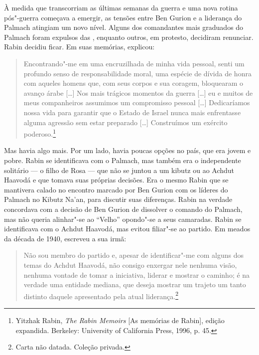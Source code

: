 À medida que transcorriam as últimas semanas da guerra e uma nova rotina
pós"-guerra começava a emergir, as tensões entre Ben Gurion e a liderança
do Palmach atingiam um novo nível. Alguns dos comandantes mais graduados
do Palmach foram expulsos das , enquanto outros, em protesto,
decidiram renunciar. Rabin decidiu ficar. Em suas memórias, explicou:

\begin{quote}
Encontrando"-me em uma encruzilhada de minha vida pessoal, senti um
profundo senso de responsabilidade moral, uma espécie de dívida de honra
com aqueles homens que, com seus corpos e sua coragem, bloquearam o
avanço árabe {[}\ldots{}{]} Nos mais trágicos momentos da guerra {[}\ldots{}{]} eu e muitos de
meus companheiros assumimos um compromisso pessoal {[}\ldots{}{]} Dedicaríamos nossa
vida para garantir que o Estado de Israel nunca mais enfrentasse alguma
agressão sem estar preparado {[}\ldots{}{]} Construímos um exército
poderoso.\footnote{Yitzhak Rabin, \emph{The Rabin Memoirs} {[}As memórias de Rabin{]}, edição expandida. Berkeley:
University of California Press, 1996, p. 45.}
\end{quote}

Mas havia algo mais. Por um lado, havia poucas opções no país, que era
jovem e pobre. Rabin se identificava com o Palmach, mas também era o
independente solitário --- o filho de Rosa --- que não se juntou a um
kibutz ou ao Achdut Haavodá e que tomava suas próprias decisões. Era o
mesmo Rabin que se mantivera calado no encontro marcado por Ben
Gurion com os líderes do Palmach no Kibutz Na'an, para discutir suas
diferenças. Rabin na verdade concordava com a decisão de Ben Gurion de
dissolver o comando do Palmach, mas não queria alinhar"-se ao ``Velho''
opondo"-se a seus camaradas. Rabin se identificava com o Achdut Haavodá,
mas evitou filiar"-se ao partido. Em meados da década de 1940, escreveu a
sua irmã: 

\begin{quote}
Não sou membro do partido e, apesar de identificar"-me com
alguns dos temas do Achdut Haavodá, não consigo enxergar nele nenhuma
visão, nenhuma vontade de tomar a iniciativa, liderar e mostrar o
caminho; é na verdade uma entidade mediana, que deseja mostrar um
trajeto um tanto distinto daquele apresentado pela atual
liderança.\footnote{Carta não datada. Coleção privada.}
\end{quote}

